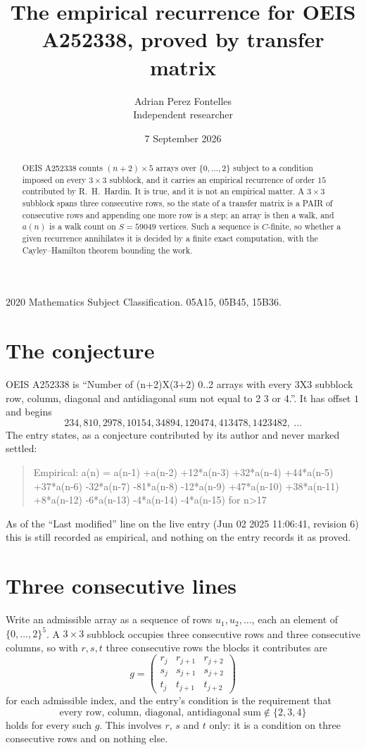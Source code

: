 \documentclass[11pt,a4paper]{article}
\title{The empirical recurrence for OEIS A252338, proved by transfer matrix}
\author{Adrian Perez Fontelles\\ \small Independent researcher}
\date{7 September 2026}
\theoremstyle{plain}
\theoremstyle{definition}
\begin{document}
\maketitle

\begin{abstract}
OEIS A252338 counts $(n+2)\times5$ arrays over $\{0,\dots,2\}$ subject to a condition imposed on
every $3\times3$ subblock, and it carries an empirical recurrence of order $15$
contributed by R.~H.~Hardin. It is true, and it is not an empirical matter. A $3\times3$
subblock spans three consecutive rows, so the state of a transfer matrix is a PAIR of
consecutive rows and appending one more row is a step; an array is then a walk, and
$a(n)$ is a walk count on $S=59049$ vertices. Such a sequence is $C$-finite, so whether a given
recurrence annihilates it is decided by a finite exact computation, with the Cayley--Hamilton
theorem bounding the work.
\end{abstract}

\noindent\small 2020 Mathematics Subject Classification. 05A15, 05B45, 15B36.\normalsize

\section{The conjecture}

OEIS A252338 is ``Number of (n+2)X(3+2) 0..2 arrays with every 3X3 subblock row, column, diagonal and antidiagonal sum not equal to 2 3 or 4.''. It has offset $1$ and begins
\[
234, 810, 2978, 10154, 34894, 120474, 413478, 1423482,\ \dots
\]
The entry states, as a conjecture contributed by its author and never marked settled:
\begin{quote}
Empirical: a(n) = a(n-1) +a(n-2) +12*a(n-3) +32*a(n-4) +44*a(n-5) +37*a(n-6) -32*a(n-7) -81*a(n-8) -12*a(n-9) +47*a(n-10) +38*a(n-11) +8*a(n-12) -6*a(n-13) -4*a(n-14) -4*a(n-15) for n>17
\end{quote}
As of the ``Last modified'' line on the live entry (Jun 02 2025 11:06:41, revision 6) this is still
recorded as empirical, and nothing on the entry records it as proved.

\section{Three consecutive lines}

Write an admissible array as a sequence of rows $u_1,u_2,\dots$, each an element of
$\{0,\dots,2\}^{5}$. A $3\times3$ subblock occupies three consecutive rows and
three consecutive columns, so with $r,s,t$ three consecutive rows the blocks it
contributes are
\[
g=\begin{pmatrix}r_j&r_{j+1}&r_{j+2}\\ s_j&s_{j+1}&s_{j+2}\\ t_j&t_{j+1}&t_{j+2}\end{pmatrix}
\]
for each admissible index, and the entry's condition is the requirement that
\[
\text{every row, column, diagonal, antidiagonal sum} \notin \{2,3,4\}
\]
holds for every such $g$. This involves $r$, $s$ and $t$ only: it is a condition on
three consecutive rows and on nothing else.
\end{document}
